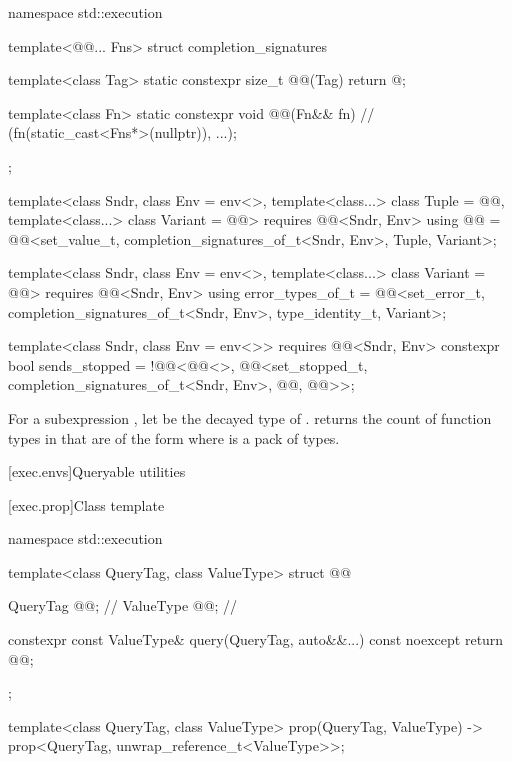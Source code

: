 \pnum
{}%
%
%
\begin{codeblock}
namespace std::execution {
  template<@@... Fns>
    struct completion_signatures {
      template<class Tag>
        static constexpr size_t @@(Tag) { return @\seebelow@; }

      template<class Fn>
        static constexpr void @@(Fn&& fn) {               // \expos
          (fn(static_cast<Fns*>(nullptr)), ...);
        }
    };

  template<class Sndr, class Env = env<>,
           template<class...> class Tuple = @@,
           template<class...> class Variant = @@>
      requires @@<Sndr, Env>
    using @@ =
      @@<set_value_t, completion_signatures_of_t<Sndr, Env>, Tuple, Variant>;

  template<class Sndr, class Env = env<>,
           template<class...> class Variant = @@>
      requires @@<Sndr, Env>
    using error_types_of_t =
      @@<set_error_t, completion_signatures_of_t<Sndr, Env>,
                        type_identity_t, Variant>;

  template<class Sndr, class Env = env<>>
      requires @@<Sndr, Env>
    constexpr bool sends_stopped =
      !@@<@@<>,
               @@<set_stopped_t, completion_signatures_of_t<Sndr, Env>,
                                 @@, @@>>;
}
\end{codeblock}

\pnum
For a subexpression ,
let  be the decayed type of .
returns the count of function types in  that
are of the form  where  is a pack of types.

[exec.envs]{Queryable utilities}

[exec.prop]{Class template }

\begin{codeblock}
namespace std::execution {
  template<class QueryTag, class ValueType>
  struct @@ {
    QueryTag @@;            // \expos
    ValueType @@;           // \expos

    constexpr const ValueType& query(QueryTag, auto&&...) const noexcept {
      return @@;
    }
  };

  template<class QueryTag, class ValueType>
    prop(QueryTag, ValueType) -> prop<QueryTag, unwrap_reference_t<ValueType>>;
}
\end{codeblock}


